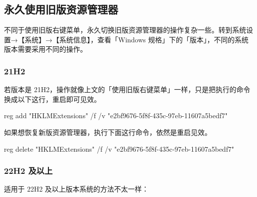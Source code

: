 \subsection{永久使用旧版资源管理器}

不同于使用旧版右键菜单，永久切换旧版资源管理器的操作复杂一些。转到系统设置→【系统】→【系统信息】，查看「Windows 规格」下的「版本」，不同的系统版本需要采用不同的操作。

\subsubsection{21H2}

若版本是 21H2，操作就像上文的「使用旧版右键菜单」一样，只是把执行的命令换成以下这行，重启即可见效。

\begin{MissingVerbatim}
  reg add "HKLM\SOFTWARE\Microsoft\Windows\CurrentVersion\Shell Extensions\Blocked" /f /v "{e2bf9676-5f8f-435c-97eb-11607a5bedf7}"
\end{MissingVerbatim}

如果想恢复新版资源管理器，执行下面这行命令，依然是重启见效。

\begin{MissingVerbatim}
  reg delete "HKLM\SOFTWARE\Microsoft\Windows\CurrentVersion\Shell Extensions\Blocked" /f /v "{e2bf9676-5f8f-435c-97eb-11607a5bedf7}"
\end{MissingVerbatim}

\subsubsection{22H2 及以上}

适用于 22H2 及以上版本系统的方法不太一样：


